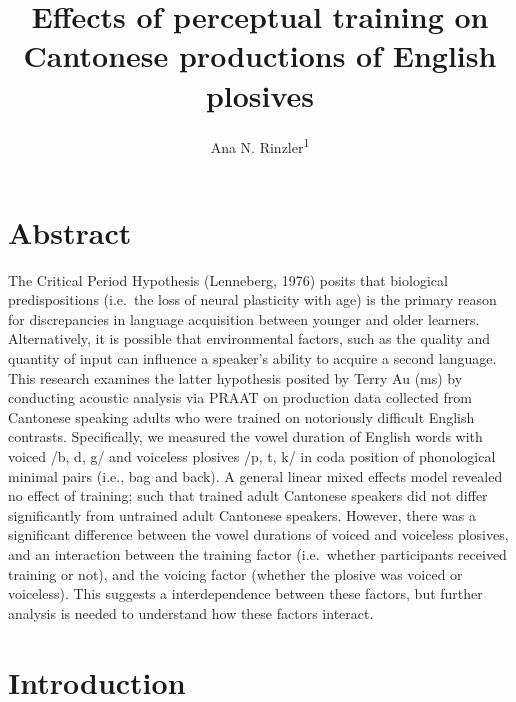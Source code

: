 \documentclass[man]{apa6}
\title{Effects of perceptual training on Cantonese productions of English
plosives}
\author{Ana N. Rinzler\textsuperscript{1}}
\affiliation{
    \vspace{0.5cm}
          \textsuperscript{1} Rutgers University, the State University of New Jersey\\
          \textsuperscript{}   }
\theoremstyle{definition}
\theoremstyle{definition}
\theoremstyle{definition}
\theoremstyle{remark}
\begin{document}
\maketitle

\setcounter{secnumdepth}{0}



\section{Abstract}\label{abstract}

The Critical Period Hypothesis (Lenneberg, 1976) posits that biological
predispositions (i.e.~the loss of neural plasticity with age) is the
primary reason for discrepancies in language acquisition between younger
and older learners. Alternatively, it is possible that environmental
factors, such as the quality and quantity of input can influence a
speaker's ability to acquire a second language. This research examines
the latter hypothesis posited by Terry Au (ms) by conducting acoustic
analysis via PRAAT on production data collected from Cantonese speaking
adults who were trained on notoriously difficult English contrasts.
Specifically, we measured the vowel duration of English words with
voiced /b, d, g/ and voiceless plosives /p, t, k/ in coda position of
phonological minimal pairs (i.e., bag and back). A general linear mixed
effects model revealed no effect of training; such that trained adult
Cantonese speakers did not differ significantly from untrained adult
Cantonese speakers. However, there was a significant difference between
the vowel durations of voiced and voiceless plosives, and an interaction
between the training factor (i.e.~whether participants received training
or not), and the voicing factor (whether the plosive was voiced or
voiceless). This suggests a interdependence between these factors, but
further analysis is needed to understand how these factors interact.

\newpage 

\section{Introduction}\label{introduction}
\end{document}
